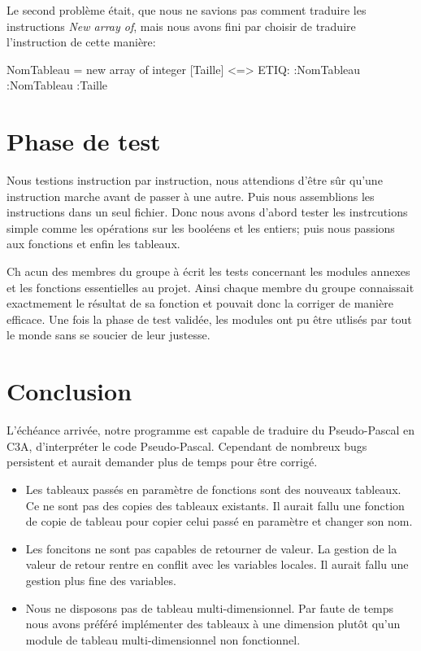 \documentclass[10pt,a4paper]{article}
\begin{document}
Le second problème était, que nous ne savions pas comment traduire les instructions \textit{New array of}, mais nous avons fini par choisir de traduire l'instruction de cette manière:

NomTableau = new array of integer [Taille] <=> ETIQ:   :NomTableau :NomTableau :Taille



\section{Phase de test}
Nous testions instruction par instruction, nous attendions d'être sûr qu'une instruction marche avant de passer à une autre. Puis nous assemblions les instructions dans un seul fichier. 
Donc nous avons d'abord tester les instrcutions simple comme les opérations sur les booléens et les entiers; puis nous passions aux fonctions et enfin les tableaux.

Ch	acun des membres du groupe à écrit les tests concernant les modules annexes et les fonctions essentielles au projet. Ainsi chaque membre du groupe connaissait exactmement le résultat de sa fonction et pouvait donc la corriger de manière efficace. Une fois la phase de test validée, les modules ont pu être utlisés par tout le monde sans se soucier de leur justesse.

\newpage
\section{Conclusion}

L'échéance arrivée, notre programme est capable de traduire du Pseudo-Pascal en C3A, d'interpréter le code Pseudo-Pascal. Cependant de nombreux bugs persistent et aurait demander plus de temps pour être corrigé.\\

\begin{itemize}
	\item Les tableaux passés en paramètre de fonctions sont des nouveaux tableaux. Ce ne sont pas des copies des tableaux existants. Il aurait fallu une fonction de copie de tableau pour copier celui passé en paramètre et changer son nom.
	\item Les foncitons ne sont pas capables de retourner de valeur. La gestion de la valeur de retour rentre en conflit avec les variables locales. Il aurait fallu une gestion plus fine des variables.
	\item Nous ne disposons pas de tableau multi-dimensionnel. Par faute de temps nous avons préféré implémenter des tableaux à une dimension plutôt qu'un module de tableau multi-dimensionnel non fonctionnel.\\
\end{itemize}
\end{document}
